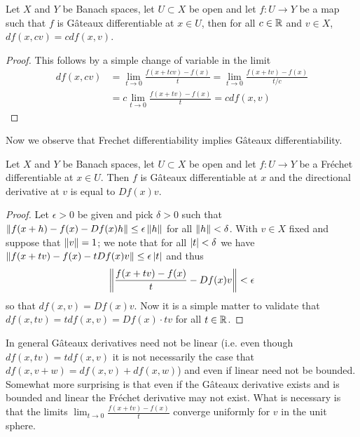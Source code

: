 \begin{prop}\label{GateauxDerivativeHomogeneous}Let $X$ and $Y$ be
  Banach spaces, let $U \subset X$ be open and let $f : U \to Y$ be
  a map such that $f$ is G\^{a}teaux differentiable at $x \in U$, then
  for all $c \in \mathbb{R}$ and $v \in X$, $df(x,cv) = cdf(x,v)$.
\end{prop}
\begin{proof}
This follows by a simple change of variable in the limit
\begin{align*}
  df(x,cv)
  &= \lim_{t \to  0} \frac{f(x + t c v) - f(x)}{t} = \lim_{t \to  0} \frac{f(x + t v) - f(x)}{t/c} \\
  &= c \lim_{t \to  0} \frac{f(x + t v) - f(x)}{t} = c df(x,v)
\end{align*} 
\end{proof}


Now we observe that Frechet differentiability implies G\^{a}teaux differentiability.
\begin{prop}\label{FrechetDifferentiableImpliesGateauxDifferentiable}Let $X$ and $Y$ be Banach spaces, let $U \subset X$ be
  open and let $f : U \to Y$ be
  a Fr\'{e}chet differentiable at $x \in U$.  Then $f$ is G\^{a}teaux
  differentiable at $x$ and the directional derivative at $v$ is equal
  to $Df(x)v$.
\end{prop}
\begin{proof}
Let $\epsilon >0$ be given and pick $\delta>0$ such
that $\left \lVert f(x+h) - f(x) -Df(x)h \right \rVert \leq \epsilon \left \lVert h \right \rVert$ for all
$\left \lVert h \right \rVert < \delta$.  With $v \in X$ fixed and suppose that $\left \lVert v \right \rVert
= 1$; we note that for all
$\left \vert t \right \vert < \delta$ we have $\left \lVert f(x+tv) - f(x) - t Df(x) v \right \rVert
\leq \epsilon \left \vert t \right \vert $ and thus 
\begin{align*}
\left \lVert \frac{f(x+tv) - f(x) }{t} - Df(x) v \right \rVert < \epsilon
\end{align*}
so that $df(x,v) = Df(x) v$.  Now it is a simple matter to validate
that $df(x, tv) = t df(x,v) = Df(x) \cdot tv$ for all $t \in \mathbb{R}$.
\end{proof}
In general G\^{a}teaux derivatives need not be linear (i.e. even
though $df(x,tv) = tdf(x,v)$ it is not necessarily the case that
$df(x,v+w) = df(x,v) + df(x,w)$) and even if
linear need not be bounded.  Somewhat more surprising is that even if
the G\^{a}teaux derivative exists and is bounded and linear the
Fr\'{e}chet derivative may not exist.  What is necessary is that the
limits $\lim_{t \to 0} \frac{f(x+tv) -f(x)}{t}$ converge uniformly for
$v$ in the unit sphere.

